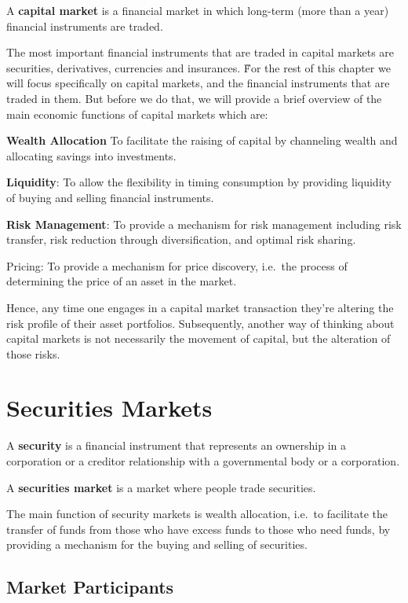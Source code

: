 A \textbf{capital market} is a financial market in which long-term (more than a year) financial instruments are traded.
\ed

The most important financial instruments that are traded in capital markets are securities, derivatives, currencies and
insurances. \v

For the rest of this chapter we will focus specifically on capital markets, and the financial instruments that are
traded in them. But before we do that, we will provide a brief overview of the main economic functions of capital
markets which are:
\bit
\item \textbf{Wealth Allocation} To facilitate the raising of capital by channeling wealth and allocating savings into
investments.
\item \textbf{Liquidity}: To allow the flexibility in timing consumption by providing liquidity of buying and selling
financial instruments.
\item \textbf{Risk Management}: To provide a mechanism for risk management including risk transfer, risk reduction
through diversification, and optimal risk sharing.
\item \item{Pricing}: To provide a mechanism for price discovery, i.e.\ the process of determining the price of an
asset in the market.
\eit

Hence, any time one engages in a capital market transaction they're altering the risk profile of their asset portfolios.
Subsequently, another way of thinking about capital markets is not necessarily the movement of capital, but the
alteration of those risks.

\section{Securities Markets}

\bd[Security]
A \textbf{security} is a financial instrument that represents an ownership in a corporation or a creditor relationship
with a governmental body or a corporation.
\ed

A \textbf{securities market} is a market where people trade securities.
\ed

The main function of security markets is wealth allocation, i.e.\ to facilitate the transfer of funds from those who
have excess funds to those who need funds, by providing a mechanism for the buying and selling of securities.

\subsection{Market Participants}

